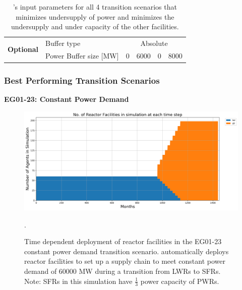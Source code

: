 \begin{frame}
\begin{table}[]
{{\begin{tabular}{l|l|c|l|l|l}
        \multirow{2}{*}{\textbf{Optional}} & Buffer type                                                    & \multicolumn{4}{c}{Absolute}                                                                                                                                                                                                                                                               \\ \cline{2-6} 
                                                  & Power Buffer size [MW]                                                   & 0 & 6000 & 0 & 8000 \\ \hline
        \end{tabular}%
        }}
        \caption{\deploy's input parameters for all 4 transition scenarios
        that minimizes undersupply of power and minimizes 
        the undersupply and under capacity of the other facilities. }
        \label{tab:bestinputs}
        \end{table}
\end{frame}

\begin{frame}
    \frametitle{Best Performing Transition Scenarios}
    \textbf{EG01-23: Constant Power Demand}
    \begin{figure}[htbp!]
        \begin{center}
          \includegraphics[width=\textwidth]{../paper/figures/eg23-stack_reactor.png}
        \end{center}
              \caption{Time dependent deployment of reactor facilities in 
              the EG01-23 constant power demand transition scenario. 
              \deploy automatically deploys reactor facilities 
              to set up a supply chain to meet constant power demand of $60000$ MW
              during a transition from \glspl{LWR} to \glspl{SFR}. Note: \glspl{SFR}
              in this simulation have $\frac{1}{3}$ power capacity of \glspl{PWR}.}.
      \end{figure}
\end{frame}

